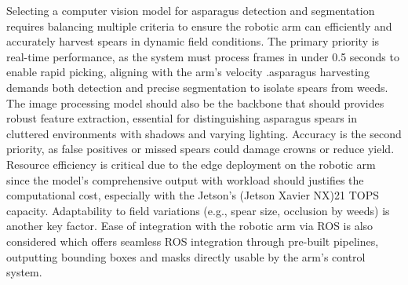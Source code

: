 Selecting a computer vision model for asparagus detection and segmentation requires balancing multiple criteria to ensure the robotic arm can efficiently and accurately harvest spears in dynamic field conditions. The primary priority is real-time performance, as the system must process frames in under 0.5 seconds to enable rapid picking, aligning with the arm’s velocity .asparagus harvesting demands both detection and precise segmentation to isolate spears from weeds. The image processing model should also be the backbone that should  provides robust feature extraction, essential for distinguishing asparagus spears in cluttered environments with shadows and varying lighting. Accuracy is the second priority, as false positives or missed spears could damage crowns or reduce yield. Resource efficiency is critical due to the edge deployment on the robotic arm since the model's comprehensive output with workload should justifies the computational cost, especially with the Jetson’s (Jetson Xavier NX)21 TOPS capacity. Adaptability to field variations (e.g., spear size, occlusion by weeds) is another key factor. Ease of integration with the robotic arm via ROS is also considered which offers seamless ROS integration through pre-built pipelines, outputting bounding boxes and masks directly usable by the arm’s control system. 


